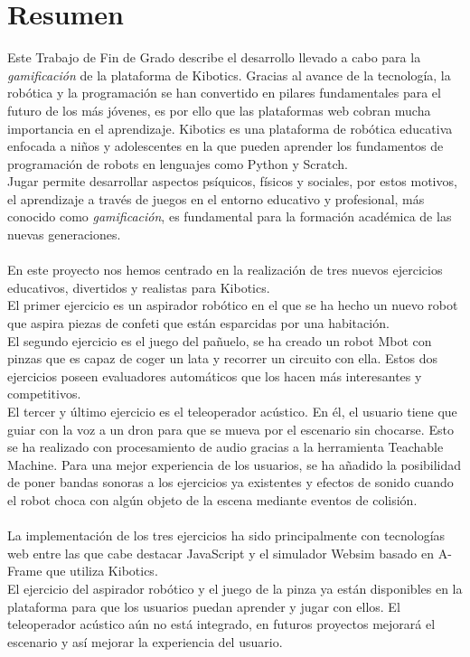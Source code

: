 \newpage
\thispagestyle{plain}			%
\setlength{\parskip}{0pt plus 1.0pt}
\section*{Resumen}
Este Trabajo de Fin de Grado describe el desarrollo llevado a cabo para la \textit{gamificación} de la plataforma de Kibotics.  
Gracias al avance de la tecnología, la robótica y la programación se han convertido en pilares fundamentales para el futuro de los más jóvenes, es por ello que las plataformas web cobran mucha importancia en el aprendizaje. Kibotics es una plataforma de robótica educativa enfocada a niños y adolescentes en la que pueden aprender los fundamentos de programación de robots en lenguajes como Python y Scratch. 
\\
Jugar permite desarrollar aspectos psíquicos, físicos y sociales, por estos motivos, el aprendizaje a través de juegos en el entorno educativo y profesional, más conocido como \textit{gamificación}, es fundamental para la formación académica de las nuevas generaciones.
\\
 \\
En este proyecto nos hemos centrado en la realización de tres nuevos ejercicios educativos, divertidos y realistas para Kibotics.
\\
El primer ejercicio  es un aspirador robótico en el que se ha hecho un nuevo robot que aspira piezas de confeti que están esparcidas por una habitación.
\\
El segundo  ejercicio  es el juego del pañuelo, se ha creado un robot Mbot con pinzas que es capaz de coger un lata y recorrer un circuito con ella. 
Estos dos ejercicios poseen evaluadores automáticos que los hacen más interesantes y competitivos.
\\
El tercer y último ejercicio es el teleoperador acústico. En él,  el usuario tiene que guiar con la voz a un dron para que se mueva por el escenario sin chocarse. Esto se ha realizado con procesamiento de audio gracias a la herramienta Teachable Machine.
Para una mejor experiencia de los usuarios, se ha  añadido la posibilidad de poner bandas sonoras a los ejercicios ya existentes y efectos de sonido cuando el robot choca con algún objeto de la escena mediante eventos de colisión.
\\
\\
La implementación de los tres ejercicios ha sido principalmente con tecnologías web entre las que cabe destacar JavaScript y el simulador Websim basado en A-Frame que utiliza Kibotics.
\\
El ejercicio del aspirador robótico y el juego de la pinza ya están disponibles en la plataforma para que los usuarios puedan aprender y jugar con ellos. El teleoperador acústico aún no está integrado, en futuros proyectos mejorará el escenario y así mejorar la experiencia del usuario.

